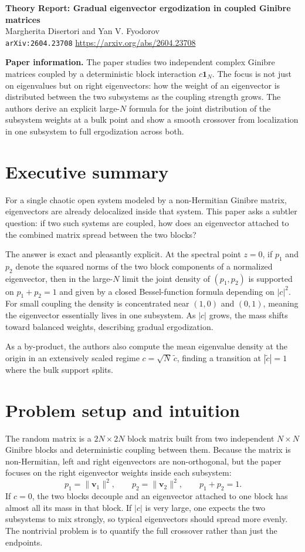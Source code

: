 \documentclass[11pt]{article}
\begin{document}
\begin{center}
{\Large \textbf{Theory Report: Gradual eigenvector ergodization in coupled Ginibre matrices}}\\[0.5em]
{\large Margherita Disertori and Yan V. Fyodorov}\\[0.25em]
\texttt{arXiv:2604.23708} \quad \url{https://arxiv.org/abs/2604.23708}
\end{center}

\textbf{Paper information.} The paper studies two independent complex Ginibre matrices coupled by a deterministic block interaction $c\mathbf 1_N$. The focus is not just on eigenvalues but on right eigenvectors: how the weight of an eigenvector is distributed between the two subsystems as the coupling strength grows. The authors derive an explicit large-$N$ formula for the joint distribution of the subsystem weights at a bulk point and show a smooth crossover from localization in one subsystem to full ergodization across both.

\section*{Executive summary}
For a single chaotic open system modeled by a non-Hermitian Ginibre matrix, eigenvectors are already delocalized inside that system. This paper asks a subtler question: if two such systems are coupled, how does an eigenvector attached to the combined matrix spread between the two blocks?

The answer is exact and pleasantly explicit. At the spectral point $z=0$, if $p_1$ and $p_2$ denote the squared norms of the two block components of a normalized eigenvector, then in the large-$N$ limit the joint density of $(p_1,p_2)$ is supported on $p_1+p_2=1$ and given by a closed Bessel-function formula depending on $|c|^2$. For small coupling the density is concentrated near $(1,0)$ and $(0,1)$, meaning the eigenvector essentially lives in one subsystem. As $|c|$ grows, the mass shifts toward balanced weights, describing gradual ergodization.

As a by-product, the authors also compute the mean eigenvalue density at the origin in an extensively scaled regime $c=\sqrt N\,\tilde c$, finding a transition at $|\tilde c|=1$ where the bulk support splits.

\section*{Problem setup and intuition}
The random matrix is a $2N\times 2N$ block matrix built from two independent $N\times N$ Ginibre blocks and deterministic coupling between them. Because the matrix is non-Hermitian, left and right eigenvectors are non-orthogonal, but the paper focuses on the right eigenvector weights inside each subsystem:
\[
p_1=\|\mathbf v_1\|^2,\qquad p_2=\|\mathbf v_2\|^2,\qquad p_1+p_2=1.
\]
If $c=0$, the two blocks decouple and an eigenvector attached to one block has almost all its mass in that block. If $|c|$ is very large, one expects the two subsystems to mix strongly, so typical eigenvectors should spread more evenly. The nontrivial problem is to quantify the full crossover rather than just the endpoints.
\end{document}
